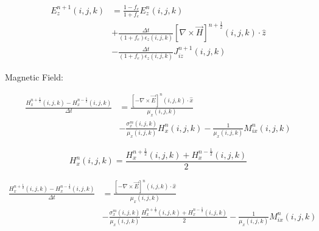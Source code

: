 \documentclass[10pt]{article}
\begin{document}
\begin{equation}
	\boxed{
		\begin{aligned}
			E^{n+1}_{z}(i,j,k) & = \frac{1-f_e}{1+f_e}  E^{n}_{z}(i,j,k)                                                                                 \\
			                   & + \frac{\Delta t}{(1+f_e)\epsilon_{z}(i,j,k)} \left[ \nabla \times \vec{H} \right]^{n+\frac{1}{2}}(i,j,k) \cdot \hat{z} \\
			                   & - \frac{\Delta t}{(1+f_e)\epsilon_{z}(i,j,k)} J^{n+1}_{iz}(i,j,k)
		\end{aligned}
	}
\end{equation}



Magnetic Field:

\begin{equation}
	\begin{aligned}
		\frac{H^{n+\frac{1}{2}}_{x}(i,j,k) - H_{x}^{n-\frac{1}{2}}(i,j,k)}{\Delta t} & =
		\frac{\left[ -\nabla\times \vec{E} \right]^{n}(i,j,k) \cdot \hat{x}}{\mu_{{x}}(i,j,k)}                                                         \\
		                                                                             & - \frac{\sigma^{m}_{x}(i,j,k)}{\mu_{x}(i,j,k)} H^{n}_{x}(i,j,k)
		- \frac{1}{\mu_{x}(i,j,k)} M^{n}_{ix}(i,j,k)
	\end{aligned}
\end{equation}

\begin{equation}
	H^{n}_{x}(i,j,k) = \frac{H^{n+\frac{1}{2}}_{x}(i,j,k)+H^{n-\frac{1}{2}}_{x}(i,j,k)}{2}
\end{equation}

\begin{equation}
	\begin{aligned}
		\frac{H^{n+\frac{1}{2}}_{x}(i,j,k) - H^{n-\frac{1}{2}}_{x}(i,j,k)}{\Delta t} & =
		\frac{\left[ -\nabla\times \vec{E} \right]^{n}(i,j,k) \cdot \hat{x}}{\mu_{{x}}(i,j,k)}                                                                                                             \\
		                                                                             & - \frac{\sigma^{m}_{x}(i,j,k)}{\mu_{x}(i,j,k)}  \frac{H^{n+\frac{1}{2}}_{x}(i,j,k)+H^{n-\frac{1}{2}}_{x}(i,j,k)}{2}
		- \frac{1}{\mu_{x}(i,j,k)} M^{n}_{ix}(i,j,k)
	\end{aligned}
\end{equation}
\end{document}
